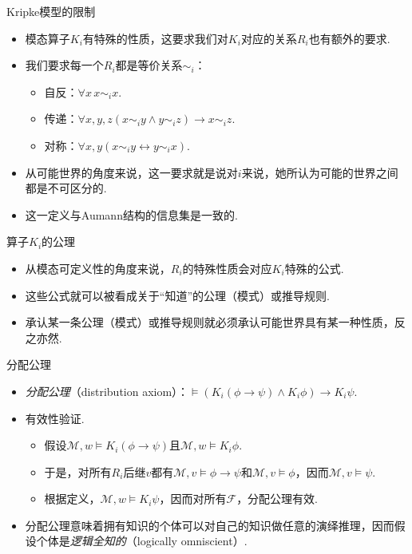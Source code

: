 \begin{frame}{Kripke模型的限制}
\begin{itemize}
    \item 模态算子$K_i$有特殊的性质，这要求我们对$K_i$对应的关系$R_i$也有额外的要求.
    \item 我们要求每一个$R_i$都是等价关系$\sim_i$：
    \begin{itemize}
        \item 自反：$\forall x\, x\sim_ix$.
        \item 传递：$\forall x,y,z(x\sim_iy\wedge y\sim_iz)\to x\sim_iz$.
        \item 对称：$\forall x,y(x \sim_i y\leftrightarrow y\sim_ix)$.
    \end{itemize}
    \item 从可能世界的角度来说，这一要求就是说对$i$来说，她所认为可能的世界之间都是不可区分的.
    \item 这一定义与Aumann结构的信息集是一致的.
\end{itemize}
\end{frame}
\begin{frame}{算子$K_i$的公理}
\begin{itemize}
    \item 从模态可定义性的角度来说，$R_i$的特殊性质会对应$K_i$特殊的公式.
    \item 这些公式就可以被看成关于“知道”的公理（模式）或推导规则.
    \item 承认某一条公理（模式）或推导规则就必须承认可能世界具有某一种性质，反之亦然.
\end{itemize}
\end{frame}
\begin{frame}{分配公理}
\begin{itemize}
    \item \emph{分配公理}（distribution axiom）：$\vDash (K_i(\phi\to\psi)\wedge K_i\phi)\to K_i\psi$.
    \item 有效性验证.
    \begin{itemize}
        \item 假设$\mathcal M,w\vDash K_i(\phi\to\psi)$且$\mathcal M,w\vDash K_i \phi$.
        \item 于是，对所有$R_i$后继$v$都有$\mathcal M,v\vDash\phi\to\psi$和$\mathcal M,v\vDash\phi$，因而$\mathcal M,v\vDash\psi$.
        \item 根据定义，$\mathcal M,w\vDash K_i\psi$，因而对所有$\mathcal F$，分配公理有效.
    \end{itemize}
    \item 分配公理意味着拥有知识的个体可以对自己的知识做任意的演绎推理，因而假设个体是\emph{逻辑全知的}（logically omniscient）.
\end{itemize}
\end{frame}

